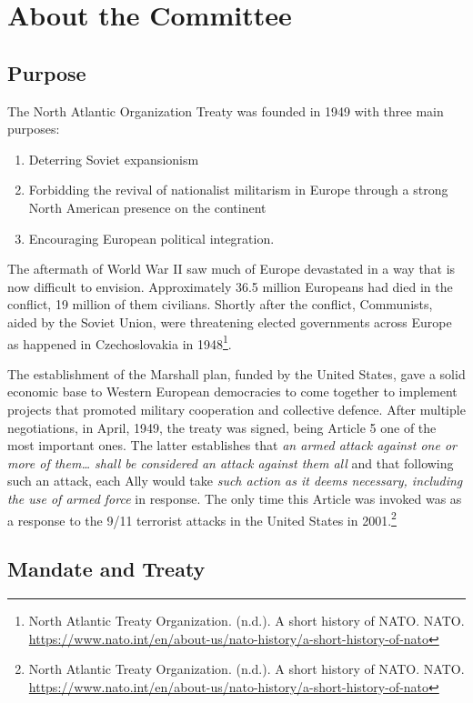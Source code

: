 \section{About the Committee}

\subsection{Purpose}

The North Atlantic Organization Treaty was founded in 1949 with three main purposes:

\begin{enumerate}
  \item Deterring Soviet expansionism
  \item Forbidding the revival of nationalist militarism in Europe through a strong North American presence on the continent
  \item Encouraging European political integration.
\end{enumerate}

The aftermath of World War II saw much of Europe devastated in a way that is now difficult to envision. Approximately 36.5 million Europeans had died in the conflict, 19 million of them civilians. Shortly after the conflict, Communists, aided by the Soviet Union, were threatening elected governments across Europe as happened in Czechoslovakia in 1948\footnote{North Atlantic Treaty Organization. (n.d.). A short history of NATO. NATO. \url{https://www.nato.int/en/about-us/nato-history/a-short-history-of-nato}}.

The establishment of the Marshall plan, funded by the United States, gave a solid economic base to Western European democracies to come together to implement projects that promoted military cooperation and collective defence. After multiple negotiations, in April, 1949, the treaty was signed, being Article 5 one of the most important ones. The latter establishes that \emph{an armed attack against one or more of them… shall be considered an attack against them all} and that following such an attack, each Ally would take \emph{such action as it deems necessary, including the use of armed force} in response. The only time this Article was invoked was as a response to the 9/11 terrorist attacks in the United States in 2001.\footnote{North Atlantic Treaty Organization. (n.d.). A short history of NATO. NATO. \url{https://www.nato.int/en/about-us/nato-history/a-short-history-of-nato}}

\subsection{Mandate and Treaty}

